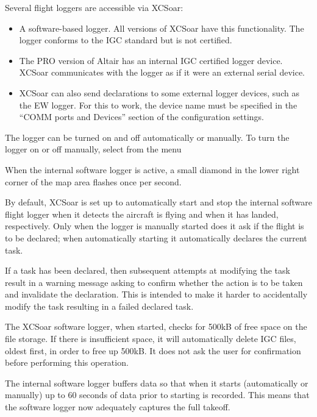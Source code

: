 \documentclass[a4paper,12pt]{refrep}
\begin{document}
Several flight loggers are accessible via XCSoar:
\begin{itemize}
\item A software-based logger.  All versions of XCSoar have this
  functionality.  The logger conforms to the IGC standard but is not
  certified.
\item The PRO version of Altair has an internal IGC certified logger device.
  XCSoar communicates with the logger as if it were an external serial device.


\item XCSoar can also send declarations to some external logger devices,
  such as the EW logger.  For this to work, the device name must be specified
  in the ``COMM ports and Devices'' section of the configuration settings.
\end{itemize}

The logger can be turned on and off automatically or manually.  
To turn the logger on or off manually, select from the menu
\begin{quote}
\blink{}
\end{quote}

When the internal software logger is active, a small diamond in the
lower right corner of the map area flashes once per second.

By default, XCSoar is set up to automatically start and stop the
internal software flight logger when it detects the aircraft is flying
and when it has landed, respectively.  Only when the logger is
manually started does it ask if the flight is to be declared; when
automatically starting it automatically declares the current task.

If a task has been declared, then subsequent attempts at modifying the
task result in a warning message asking to confirm whether the action
is to be taken and invalidate the declaration.  This is intended to
make it harder to accidentally modify the task resulting in a failed
declared task.

The XCSoar software logger, when started, checks for 500kB of free
space on the file storage.  If there is insufficient space, it will
automatically delete IGC files, oldest first, in order to free up
500kB.  It does not ask the user for confirmation before performing
this operation.

The internal software logger buffers data so that when it starts
(automatically or manually) up to 60 seconds of data prior to starting
is recorded.  This means that the software logger now adequately
captures the full takeoff.
\end{document}

